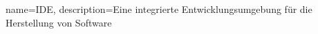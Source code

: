 {
	name=IDE,
	description={Eine integrierte Entwicklungsumgebung für die Herstellung von Software}
}
